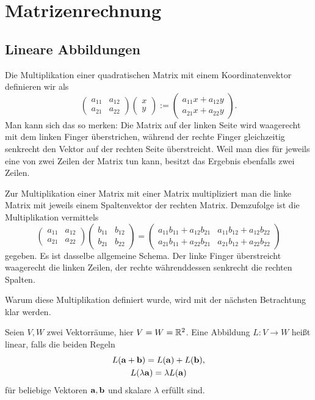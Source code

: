 \section{Matrizenrechnung}
\subsection{Lineare Abbildungen}

Die Multiplikation einer quadratischen Matrix mit einem
Koordinatenvektor definieren wir als
\[\begin{pmatrix}
a_{11} & a_{12}\\
a_{21} & a_{22}
\end{pmatrix}\begin{pmatrix}x \\ y\end{pmatrix}
:= \begin{pmatrix}a_{11}x+a_{12}y \\ a_{21}x+a_{22}y\end{pmatrix}.\]
Man kann sich das so merken: Die Matrix auf der linken Seite wird
waagerecht mit dem linken Finger überstrichen, während der rechte
Finger gleichzeitig senkrecht den Vektor auf der rechten Seite
überstreicht. Weil man dies für jeweils eine von zwei Zeilen der Matrix
tun kann, besitzt das Ergebnis ebenfalls zwei Zeilen.

Zur Multiplikation einer Matrix mit einer Matrix multipliziert man
die linke Matrix mit jeweils einem Spaltenvektor der rechten
Matrix. Demzufolge ist die Multiplikation vermittels
\[\begin{pmatrix}
a_{11} &\!\! a_{12}\\
a_{21} &\!\! a_{22}
\end{pmatrix}\begin{pmatrix}
b_{11} &\!\! b_{12}\\
b_{21} &\!\! b_{22}
\end{pmatrix} = \begin{pmatrix}
a_{11}b_{11}+a_{12}b_{21} &\! a_{11}b_{12}+a_{12}b_{22}\\
a_{21}b_{11}+a_{22}b_{21} &\! a_{21}b_{12}+a_{22}b_{22}
\end{pmatrix}\]
gegeben. Es ist dasselbe allgemeine Schema. Der linke Finger
überstreicht waagerecht die linken Zeilen, der rechte währenddessen
senkrecht die rechten Spalten.

Warum diese Multiplikation definiert wurde, wird mit der nächsten
Betrachtung klar werden.

Seien $V,W$ zwei Vektorräume, hier $V=W=\mathbb R^2$. Eine Abbildung
$L\colon V\to W$ heißt linear, falls die beiden Regeln
\begin{gather}\label{eq:homogen}
L(\mathbf{a} + \mathbf{b}) = L(\mathbf{a}) + L(\mathbf{b}),\\
\label{eq:additiv}
L(\lambda\mathbf{a}) = \lambda L(\mathbf{a})
\end{gather}
für beliebige Vektoren $\mathbf{a},\mathbf{b}$ und skalare $\lambda$ erfüllt
sind.

